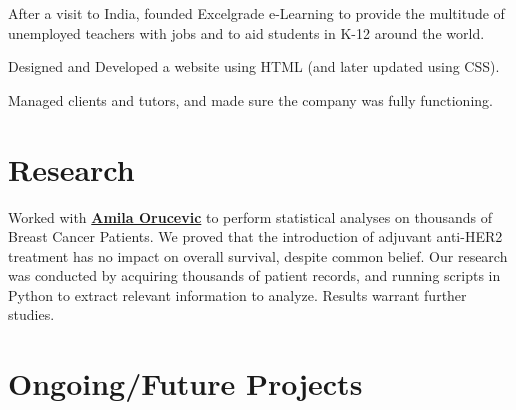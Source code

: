 \documentclass[letterpaper]{deedy-resume} %
\begin{document}
\begin{minipage}[t]{0.66\textwidth}
\vspace{\topsep} %
\begin{tightitemize}
\item After a visit to India, founded Excelgrade e-Learning to provide the multitude of unemployed teachers with jobs and to aid students in K-12 around the world.
\item Designed and Developed a website using HTML (and later updated using CSS).
\item Managed clients and tutors, and made sure the company was fully functioning.
\end{tightitemize}

\sectionspace %


\section{Research}


Worked with \textbf{\href{http://gsm.utmck.edu/pathology/faculty/orucevic.cfm}{Amila Orucevic}} to perform statistical analyses on thousands of Breast Cancer Patients. We proved that the introduction of adjuvant anti-HER2 treatment has no impact on overall survival, despite common belief. Our research was conducted by acquiring thousands of patient records, and running scripts in Python to extract relevant information to analyze. Results warrant further studies.

\sectionspace %


\section{Ongoing/Future Projects}



\vspace{\topsep} %


\end{minipage}
\end{document}
